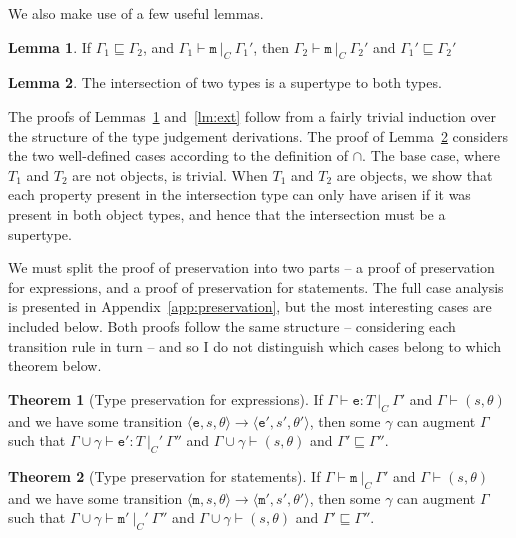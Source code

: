 \documentclass[12pt,a4paper,twoside,openright]{report}
\theoremstyle{definition}
\theoremstyle{dotless}
\newtheorem{lemma}{Lemma}[section]
\newtheorem{theorem}{Theorem}[section]
\newcommand{\transition}[6]{\langle{}\mathtt{#1},#2,#3\rangle{}\rightarrow{}\langle{}\mathtt{#4},#5,#6\rangle}
\begin{document}
We also make use of a few useful lemmas.
\begin{lemma}
  \label{lm:strChain}
  If $\Gamma_1 \sqsubseteq \Gamma_2$, and $\Gamma_1\vdash\mathtt{m}\ |_C\ \Gamma_1'$, 
  then $\Gamma_2\vdash\mathtt{m}\ |_C\ \Gamma_2'$ and
  $\Gamma_1'\sqsubseteq\Gamma_2'$ 
\end{lemma}
\begin{lemma}
  \label{lm:intersect}
	The intersection of two types is a supertype to both types. 
\end{lemma}

The proofs of Lemmas~\ref{lm:strChain} and~\ref{lm:ext} follow from a fairly trivial induction
over the structure of the type judgement derivations. The proof of Lemma~\ref{lm:intersect} considers the 
two well-defined cases according to the definition of $\cap$. The base case, where $T_1$ and $T_2$ are not 
objects, is trivial. When $T_1$ and $T_2$ are objects, we show that each property present in the intersection
type can only have arisen if it was present in both object types, and hence that the intersection
must be a supertype.

We must split the proof of preservation into two parts -- a proof of
preservation for expressions, and a proof of preservation for statements. The
full case analysis is presented in Appendix~\ref{app:preservation}, but the
most interesting cases are included below. Both proofs follow the same
structure -- considering each transition rule in turn -- and so I do not
distinguish which cases belong to which theorem below.

\begin{theorem}[Type preservation for expressions]\label{expPreservation}
	If $\Gamma\vdash \mathtt{e}:T\ |_C\ \Gamma'$ and $\Gamma\vdash(s, \theta)$ and we have some
	transition $\transition{e}{s}{\theta}{e'}{s'}{\theta'}$, then some $\gamma$ can augment $\Gamma$ such that
	$\Gamma\!\cup\!\gamma\vdash\mathtt{e'}:T\ |_C'\ \Gamma''$ and $\Gamma\!\cup\!\gamma\vdash(s,\theta)$ and
	$\Gamma'\sqsubseteq\Gamma''$.
\end{theorem}
\begin{theorem}[Type preservation for statements]\label{mPreservation}
	If $\Gamma\vdash \mathtt{m}\ |_C\ \Gamma'$ and $\Gamma\vdash(s, \theta)$ and we have some
	transition $\transition{m}{s}{\theta}{m'}{s'}{\theta'}$, then some $\gamma$ can augment $\Gamma$ such that
	$\Gamma\!\cup\!\gamma\vdash\mathtt{m'}\ |_C'\ \Gamma''$ and $\Gamma\!\cup\!\gamma\vdash(s,\theta)$ and 
	$\Gamma'\sqsubseteq\Gamma''$.
\end{theorem}
\end{document}
